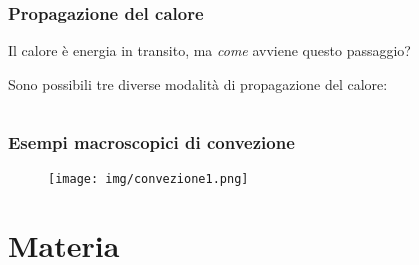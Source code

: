 \documentclass[]{beamer}
\theoremstyle{plain}
\begin{document}
\begin{frame}
\frametitle{Propagazione del calore}
Il calore è energia in transito, ma \emph{come} avviene questo passaggio?\pause

Sono possibili tre diverse \alert{modalità di propagazione del calore}:
  \begin{columns}
    \begin{column}{0.33\textwidth}
    \end{column}
    \begin{column}{0.33\textwidth}
    \end{column}
    \begin{column}{0.33\textwidth}
    \end{column}
  \end{columns}
\end{frame}




\begin{frame}
\frametitle{Esempi macroscopici di convezione}
\begin{figure}
\texttt{[image: img/convezione1.png]}
\end{figure}
\end{frame}


\section{Materia}
\end{document}
